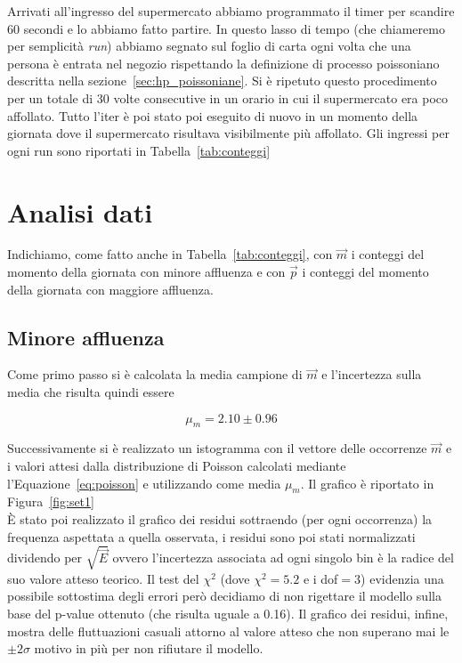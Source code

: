 \documentclass[a4paper,12pt]{article}
\begin{document}
Arrivati all'ingresso del supermercato abbiamo programmato il timer per scandire 60 secondi e lo abbiamo fatto partire. In questo lasso di tempo (che chiameremo per semplicità \textit{run}) abbiamo segnato sul foglio di carta ogni volta che una persona è entrata nel negozio rispettando la definizione di processo poissoniano descritta nella sezione~\ref{sec:hp_poissoniane}. 
Si è ripetuto questo procedimento per un totale di 30 volte consecutive in un orario in cui il supermercato era poco affollato. Tutto l'iter è poi stato poi eseguito di nuovo in un momento della giornata dove il supermercato risultava visibilmente più affollato. Gli ingressi per ogni run sono riportati in Tabella~\ref{tab:conteggi}

\section{Analisi dati}

Indichiamo, come fatto anche in Tabella~\ref{tab:conteggi}, con $\vec{m}$ i conteggi del momento della giornata con minore affluenza e con $\vec{p}$ i conteggi del momento della giornata con maggiore affluenza. 

\subsection{Minore affluenza}\label{sec:min_affluenza}

Come primo passo si è calcolata la media campione di $\vec{m}$ e l'incertezza sulla media che risulta quindi essere

\[ \mu_m = 2.10 \pm 0.96 \]

Successivamente si è realizzato un istogramma con il vettore delle occorrenze $\vec{m}$ e i valori attesi dalla distribuzione di Poisson calcolati mediante l'Equazione~\ref{eq:poisson} e utilizzando come media $\mu_m$. Il grafico è riportato in Figura~\ref{fig:set1}\\
\`E stato poi realizzato il grafico dei residui sottraendo (per ogni occorrenza) la frequenza aspettata a quella osservata, i residui sono poi stati normalizzati dividendo per $\sqrt{\vec{E}}$ ovvero l'incertezza associata ad ogni singolo bin è la radice del suo valore atteso teorico.
Il test del $\chi^2$ (dove $\chi^2 = 5.2$ e i dof$=3$) evidenzia una possibile sottostima degli errori però decidiamo di non rigettare il modello sulla base del p-value ottenuto (che risulta uguale a 0.16).
Il grafico dei residui, infine, mostra delle fluttuazioni casuali attorno al valore atteso che non superano mai le $\pm2\sigma$ motivo in più per non rifiutare il modello.
\end{document}
